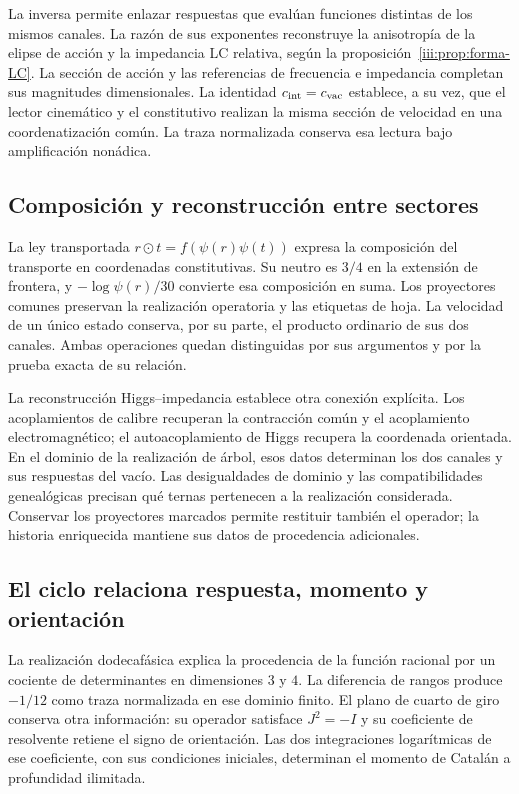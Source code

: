 La inversa permite enlazar respuestas que evalúan funciones distintas
de los mismos canales. La razón de sus exponentes reconstruye la
anisotropía de la elipse de acción y la impedancia LC relativa,
según la proposición~\ref{iii:prop:forma-LC}. La sección de acción
y las referencias de frecuencia e impedancia completan sus magnitudes dimensionales.
La identidad $c_{\rm int}=c_{\rm vac}$ establece, a su vez, que el
lector cinemático y el constitutivo realizan la misma sección de
velocidad en una coordenatización común. La traza normalizada conserva esa
lectura bajo amplificación nonádica.

\subsection*{Composición y reconstrucción entre sectores}

La ley transportada $r\odot t=f(\psi(r)\psi(t))$ expresa la composición
del transporte en coordenadas constitutivas. Su neutro es $3/4$ en la
extensión de frontera, y $-\log\psi(r)/30$ convierte esa composición en
suma. Los proyectores comunes preservan la realización operatoria y las
etiquetas de hoja. La velocidad de un único estado conserva, por su parte,
el producto ordinario de sus dos canales. Ambas operaciones quedan
distinguidas por sus argumentos y por la prueba exacta de su relación.

La reconstrucción Higgs--impedancia establece otra conexión explícita.
Los acoplamientos de calibre recuperan la contracción común y el
acoplamiento electromagnético; el autoacoplamiento de Higgs recupera la
coordenada orientada. En el dominio de la realización de árbol, esos
datos determinan los dos canales y sus respuestas del vacío. Las
desigualdades de dominio y las compatibilidades genealógicas precisan
qué ternas pertenecen a la realización considerada. Conservar los
proyectores marcados permite restituir también el operador; la historia
enriquecida mantiene sus datos de procedencia adicionales.

\subsection*{El ciclo relaciona respuesta, momento y orientación}

La realización dodecafásica explica la procedencia de la función
racional por un cociente de determinantes en dimensiones $3$ y $4$.
La diferencia de rangos produce $-1/12$ como traza normalizada en ese
dominio finito. El plano de cuarto de giro conserva otra información:
su operador satisface $J^2=-I$ y su coeficiente de resolvente retiene
el signo de orientación. Las dos integraciones logarítmicas de ese
coeficiente, con sus condiciones iniciales, determinan el momento
de Catalán a profundidad ilimitada.

